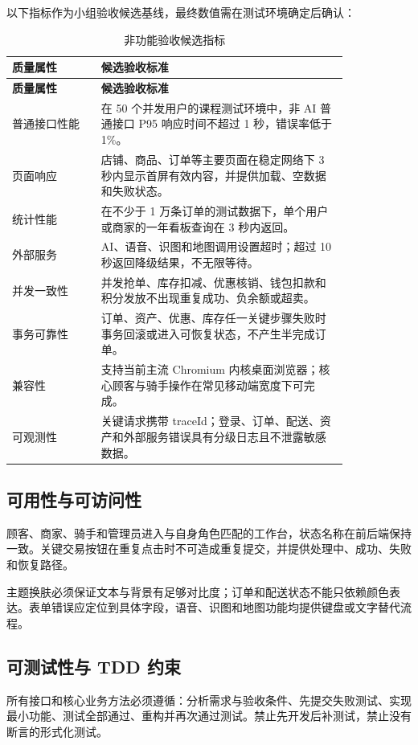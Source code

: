 以下指标作为小组验收候选基线，最终数值需在测试环境确定后确认：

\begin{longtable}{@{}p{0.22\linewidth}p{0.61\linewidth}@{}}
\caption{非功能验收候选指标}\tabularnewline
\toprule
\textbf{质量属性} & \textbf{候选验收标准} \\
\midrule
\endfirsthead
\toprule
\textbf{质量属性} & \textbf{候选验收标准} \\
\midrule
\endhead
\bottomrule
\endfoot
普通接口性能 & 在 50 个并发用户的课程测试环境中，非 AI 普通接口 P95 响应时间不超过 1 秒，错误率低于 1\%。 \\
页面响应 & 店铺、商品、订单等主要页面在稳定网络下 3 秒内显示首屏有效内容，并提供加载、空数据和失败状态。 \\
统计性能 & 在不少于 1 万条订单的测试数据下，单个用户或商家的一年看板查询在 3 秒内返回。 \\
外部服务 & AI、语音、识图和地图调用设置超时；超过 10 秒返回降级结果，不无限等待。 \\
并发一致性 & 并发抢单、库存扣减、优惠核销、钱包扣款和积分发放不出现重复成功、负余额或超卖。 \\
事务可靠性 & 订单、资产、优惠、库存任一关键步骤失败时事务回滚或进入可恢复状态，不产生半完成订单。 \\
兼容性 & 支持当前主流 Chromium 内核桌面浏览器；核心顾客与骑手操作在常见移动端宽度下可完成。 \\
可观测性 & 关键请求携带 traceId；登录、订单、配送、资产和外部服务错误具有分级日志且不泄露敏感数据。 \\
\end{longtable}

\subsection{可用性与可访问性}

顾客、商家、骑手和管理员进入与自身角色匹配的工作台，状态名称在前后端保持一致。关键交易按钮在重复点击时不可造成重复提交，并提供处理中、成功、失败和恢复路径。

主题换肤必须保证文本与背景有足够对比度；订单和配送状态不能只依赖颜色表达。表单错误应定位到具体字段，语音、识图和地图功能均提供键盘或文字替代流程。

\subsection{可测试性与 TDD 约束}

所有接口和核心业务方法必须遵循：分析需求与验收条件、先提交失败测试、实现最小功能、测试全部通过、重构并再次通过测试。禁止先开发后补测试，禁止没有断言的形式化测试。

